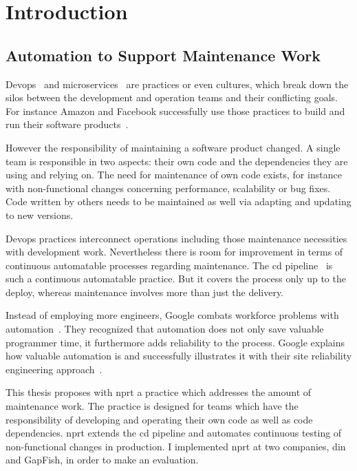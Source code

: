 \chapter{Introduction}
\label{chap:intro}
\section{Automation to Support Maintenance Work}

Devops~\cite{devops_definition} and microservices~\cite{microservices_fowler} are
practices or even cultures, which break down the silos between the development and
operation teams and their conflicting goals. For instance Amazon and Facebook successfully
use those practices to build and run their software products~\cite{build_run,dev_at_fb}.

However the responsibility of maintaining a software product changed. A single team is
responsible in two aspects: their own code and the dependencies they are using and relying
on. The need for maintenance of own code exists, for instance with non-functional changes
concerning performance, scalability or bug fixes. Code written by others needs to be
maintained as well via adapting and updating to new versions.

Devops practices interconnect operations including those maintenance necessities with
development work. Nevertheless there is room for improvement in terms of continuous
automatable processes regarding maintenance. The \gls{cd}
pipeline~\cite{cd_humble_pipeline} is such a continuous automatable practice. But it
covers the process only up to the deploy, whereas maintenance involves more than just the
delivery.

Instead of employing more engineers, Google combats workforce problems with
automation~\cite{sre_automation}. They recognized that automation does not only save
valuable programmer time, it furthermore adds reliability to the process. Google explains
how valuable automation is and successfully illustrates it with their site reliability
engineering approach~\cite{sre_intro}.

This thesis proposes with \gls{nprt} a practice which addresses the amount of maintenance
work. The practice is designed for teams which have the responsibility of developing and
operating their own code as well as code dependencies. \gls{nprt} extends the \gls{cd}
pipeline and automates continuous testing of non-functional changes in production. I
implemented \gls{nprt} at two companies, \gls{din} and GapFish, in order to make an
evaluation.

